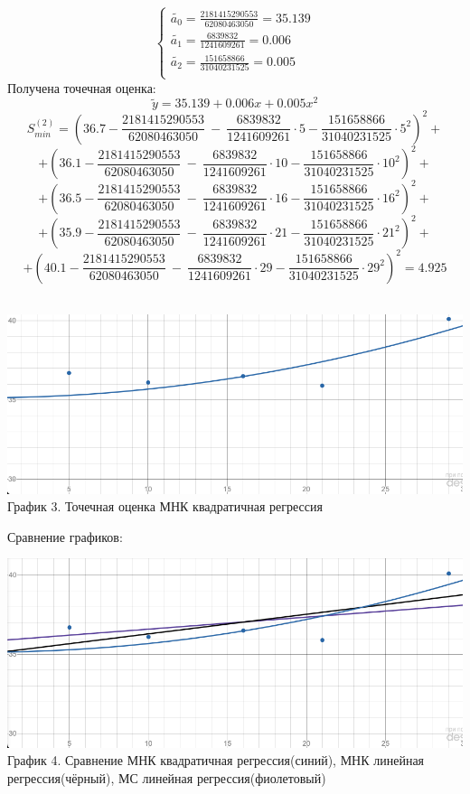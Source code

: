 \documentclass{article}
\begin{document}
\[\begin{cases}
    \tilde{a_0} = \frac{2181415290553}{62080463050} = 35.139\\
    \tilde{a_1} = \frac{6839832}{1241609261} =0.006\\
    \tilde{a_2} = \frac{151658866}{31040231525} = 0.005\\
\end{cases}\]
Получена точечная оценка:
\[\tilde{y} = 35.139+0.006x+0.005x^2\]
\[S_{min}^{(2)} = \left(36.7-\frac{2181415290553}{62080463050}\ -\ \frac{6839832}{1241609261}\cdot5-\frac{151658866}{31040231525}\cdot5^{2}\right)^{2}+\]
\[+\left(36.1-\frac{2181415290553}{62080463050}\ -\ \frac{6839832}{1241609261}\cdot10-\frac{151658866}{31040231525}\cdot10^{2}\right)^{2}+\]
\[+\left(36.5-\frac{2181415290553}{62080463050}\ -\ \frac{6839832}{1241609261}\cdot16-\frac{151658866}{31040231525}\cdot16^{2}\right)^{2}+\]
\[+\left(35.9-\frac{2181415290553}{62080463050}\ -\ \frac{6839832}{1241609261}\cdot21-\frac{151658866}{31040231525}\cdot21^{2}\right)^{2}+\]
\[+\left(40.1-\frac{2181415290553}{62080463050}\ -\ \frac{6839832}{1241609261}\cdot29-\frac{151658866}{31040231525}\cdot29^{2}\right)^{2} = 4.925\]
\\
\begin{center}
    \includegraphics[width=.8\textwidth]{kvas.png}\\
    График 3. Точечная оценка МНК квадратичная регрессия
\end{center}
Сравнение графиков:
\begin{center}
    \includegraphics[width=.8\textwidth]{kvakva.png}\\
    График 4. Сравнение МНК квадратичная регрессия(синий), МНК линейная регрессия(чёрный), МС линейная регрессия(фиолетовый)
\end{center}
\end{document}

